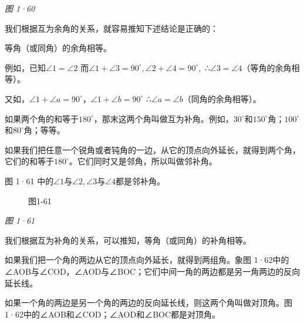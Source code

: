 \emph{图 1·60}

我们根据互为余角的关系，就容易推知下述结论是正确的：

等角（或同角）的余角相等。

例如，已知\(\angle 1 = \angle 2\)
而\(\angle 1 + \angle 3 = 90^{\circ},\angle 2 + \angle 4 = 90^{\circ},\)
∴\(\angle3=\angle4\)（等角的余角相等）。

又如，\(\angle 1 + \angle a = 90^{\circ}\)，\(\angle 1 + \angle b = 90^{\circ}\)
∴\(\angle a = \angle b\)（同角的余角相等）。

如果两个角的和等于\(180^{\circ}\)，那末这两个角叫做互为补角。例如，\(30^{\circ}\)和\(150^{\circ}\)角；\(100^{\circ}\)和\(80^{\circ}\)角；等等。

如果我们把任意一个锐角或者钝角的一边，从它的顶点向外延长，就得到两个角，它们的和等于\(180^{\circ}\)。它们同时又是邻角，所以叫做邻补角。

图 1·61 中的\(\angle1\)与\(\angle2,\angle3\)与\(\angle4\)都是邻补角。

\begin{figure}
\centering
{}
\caption{图1-61}
\end{figure}

\emph{图 1·61}

我们根据互为补角的关系，可以推知，等角（或同角）的补角相等。

如果我们把一个角的两边从它的顶点向外延长，就得到两组角。象图
1·62中的∠AOB与∠COD，∠AOD与∠BOC；它们中间一角的两边都是另一角两边的反向延长线。

如果一个角的两边是另一个角的两边的反向延长线，则这两个角叫做对顶角。图
1·62中的∠AOB和∠COD；∠AOD和∠BOC都是对顶角。

